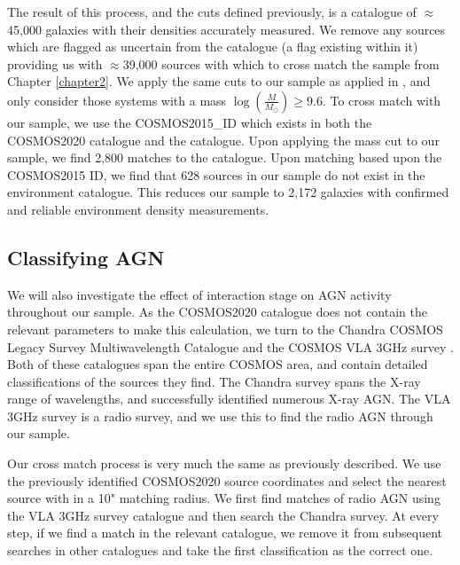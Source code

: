 The result of this process, and the cuts defined previously, is a catalogue of $\approx$45,000 galaxies with their densities accurately measured. We remove any sources which are flagged as uncertain from the catalogue (a flag existing within it) providing us with $\approx$39,000 sources with which to cross match the sample from Chapter \ref{chapter2}. We apply the same cuts to our sample as applied in \citet{2017ApJ...837...16D}, and only consider those systems with a mass $\log(\frac{M}{M_\odot}) \geq 9.6$. To cross match with our sample, we use the COSMOS2015\_ID which exists in both the COSMOS2020 catalogue and the \citet{2017ApJ...837...16D} catalogue. Upon applying the mass cut to our sample, we find 2,800 matches to the \citet{2017ApJ...837...16D} catalogue. Upon matching based upon the COSMOS2015 ID, we find that 628 sources in our sample do not exist in the environment catalogue. This reduces our sample to 2,172 galaxies with confirmed and reliable environment density measurements.

\subsection{Classifying AGN}\label{sec:agn-clsf}
\noindent We will also investigate the effect of interaction stage on AGN activity throughout our sample. As the COSMOS2020 catalogue does not contain the relevant parameters to make this calculation, we turn to the Chandra COSMOS Legacy Survey Multiwavelength Catalogue \citep{2016ApJ...817...34M} and the COSMOS VLA 3GHz survey \citep{2017A&A...602A...6S, 2017A&A...602A...3D}. Both of these catalogues span the entire COSMOS area, and contain detailed classifications of the sources they find. The Chandra survey spans the X-ray range of wavelengths, and successfully identified numerous X-ray AGN. The VLA 3GHz survey is a radio survey, and we use this to find the radio AGN through our sample. 

Our cross match process is very much the same as previously described. We use the previously identified COSMOS2020 source coordinates and select the nearest source with in a 10" matching radius. We first find matches of radio AGN using the VLA 3GHz survey catalogue and then search the Chandra survey. At every step, if we find a match in the relevant catalogue, we remove it from subsequent searches in other catalogues and take the first classification as the correct one.

